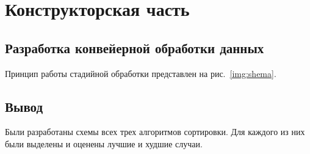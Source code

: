 \chapter{Конструкторская часть}

\section{Разработка конвейерной обработки данных}

Принцип работы стадийной обработки представлен на рис.~\ref{img:shema}.


\section*{Вывод}

Были разработаны схемы всех трех алгоритмов сортировки.
Для каждого из них были выделены и оценены лучшие и худшие случаи.
